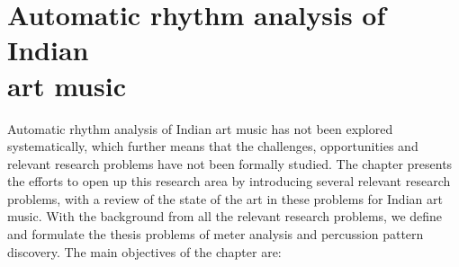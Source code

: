 \chapter[Automatic rhythm analysis of Indian art music]{Automatic rhythm analysis of Indian\\ art music}\label{chap:probdef}
\begin{epigraphs}
\end{epigraphs}
Automatic rhythm analysis of Indian art music has not been explored systematically, which further means that the challenges, opportunities and relevant research problems have not been formally studied. The chapter presents the efforts to open up this research area by introducing several relevant research problems, with a review of the state of the art in these problems for Indian art music. With the background from all the relevant research problems, we define and formulate the thesis problems of meter analysis and percussion pattern discovery. The main objectives of the chapter are:

